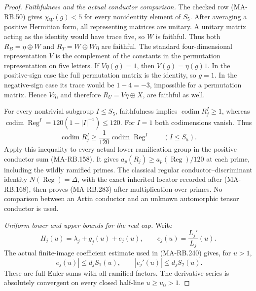 \begin{proof}
\emph{Faithfulness and the actual conductor comparison.}
The checked row (MA-RB.50) gives
\(\chi_W(g)<5\) for every nonidentity element of \(S_5\).
After averaging a positive Hermitian form, all representing
matrices are unitary. A unitary matrix acting as the identity
would have trace five, so \(W\) is faithful. Thus both
\(R_B=\eta\oplus W\) and \(R_T=W\oplus W\eta\)
are faithful. The standard four-dimensional representation
\(V\) is the complement of the constants in the permutation
representation on five letters. If \(V\eta(g)=1\), then
\(V(g)=\eta(g)1\). In the positive-sign case the full
permutation matrix is the identity, so \(g=1\). In the
negative-sign case its trace would be \(1-4=-3\), impossible
for a permutation matrix. Hence \(V\eta\), and therefore
\(R_U=V\eta\oplus X\), are faithful as well.

For every nontrivial subgroup \(I\le S_5\), faithfulness
implies \(\operatorname{codim}R_j^I\ge1\), whereas
\(\operatorname{codim}\operatorname{Reg}^I
   =120(1-|I|^{-1})\le120\).
For \(I=1\) both codimensions vanish. Thus
\[
 \operatorname{codim}R_j^I
       \ge\frac1{120}\operatorname{codim}\operatorname{Reg}^I
                                           \qquad(I\le S_5).
 \tag{MA-RB.286}
\]
Apply this inequality to every actual lower ramification
group in the positive conductor sum (MA-RB.158). It gives
\(a_p(R_j)\ge a_p(\operatorname{Reg})/120\) at each prime,
including the wildly ramified primes. The classical regular
conductor--discriminant identity
\(N(\operatorname{Reg})=\Delta\), with the exact inherited
locator recorded after (MA-RB.168), then proves (MA-RB.283)
after multiplication over primes. No comparison between
an Artin conductor and an unknown automorphic tensor
conductor is used.

\emph{Uniform lower and upper bounds for the real cap.}
Write
\[
             H_j(u)=\lambda_j+g_j(u)+e_j(u),
                         \qquad e_j(u)=\frac{L_j'}{L_j}(u).
 \tag{MA-RB.287}
\]
The actual finite-image coefficient estimate used in
(MA-RB.240) gives, for \(u>1\),
\[
          |e_j(u)|\le d_jS_1(u),\qquad
          |e_j'(u)|\le d_jS_2(u).
 \tag{MA-RB.288}
\]
These are full Euler sums with all ramified factors.
The derivative series is absolutely convergent on every
closed half-line \(u\ge u_0>1\).


\end{proof}
